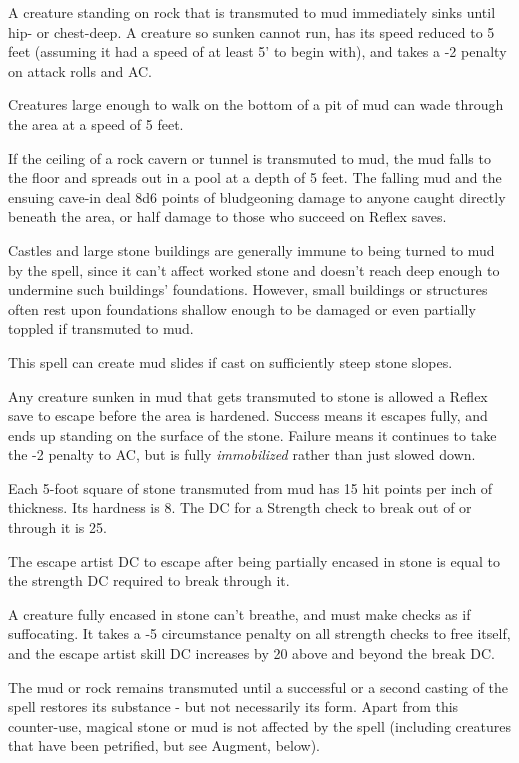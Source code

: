 \begin{list}{}{\leftmargin=1em}
 \item A creature standing on rock that is transmuted to mud immediately sinks until hip- or chest-deep.
 A creature so sunken cannot run, has its speed reduced to 5 feet (assuming it had a speed of at least 5' to begin with), and takes a -2 penalty on attack rolls and AC.
 \item Creatures large enough to walk on the bottom of a pit of mud can wade through the area at a speed of 5 feet.
 \item If the ceiling of a rock cavern or tunnel is transmuted to mud, the mud falls to the floor and spreads out in a pool at a depth of 5 feet. 
 The falling mud and the ensuing cave-in deal 8d6 points of bludgeoning damage to anyone caught directly beneath the area, or half damage to those who succeed on Reflex saves.
 \item Castles and large stone buildings are generally immune to being turned to mud by the spell, 
 since it can't affect worked stone and doesn't reach deep enough to undermine such buildings' foundations. 
 However, small buildings or structures often rest upon foundations shallow enough to be damaged or even partially toppled if transmuted to mud.
 \item This spell can create mud slides if cast on sufficiently steep stone slopes.
 \item Any creature sunken in mud that gets transmuted to stone is allowed a Reflex save to escape before the area is hardened.
 Success means it escapes fully, and ends up standing on the surface of the stone. Failure means it continues to take the -2 penalty to AC,
 but is fully \emph{immobilized} rather than just slowed down.
 \item  Each 5-foot square of stone transmuted from mud has 15 hit points per inch of thickness.
 Its hardness is 8. The DC for a Strength check to break out of or through it is 25.
 \item The escape artist DC to escape after being partially encased in stone is equal to the strength DC required to break through it.
 \item A creature fully encased in stone can't breathe, and must make checks as if suffocating. 
 It takes a -5 circumstance penalty on all strength checks to free itself, and the escape artist skill DC increases by 20 above and beyond the break DC.
\end{list}
The mud or rock remains transmuted until a successful  or a second casting of the spell restores its substance - but not necessarily its form. 
Apart from this counter-use, magical stone or mud is not affected by the spell (including creatures that have been petrified, but see Augment, below).

